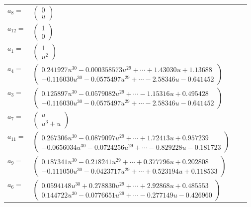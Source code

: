 \documentclass[1p]{elsarticle_modified}
\theoremstyle{definition}
\begin{document}
\begin{tabular}{m{7pt} m{180pt} m{7pt} m{180pt} }
\flushright $a_{8}=$&$\begin{pmatrix}0\\u\end{pmatrix}$ \\
\flushright $a_{12}=$&$\begin{pmatrix}1\\0\end{pmatrix}$ \\
\flushright $a_{1}=$&$\begin{pmatrix}1\\u^2\end{pmatrix}$ \\
\flushright $a_{4}=$&$\begin{pmatrix}0.241927 u^{30}-0.000358573 u^{29}+\cdots+1.43030 u+1.13688\\-0.116030 u^{30}-0.0575497 u^{29}+\cdots-2.58346 u-0.641452\end{pmatrix}$ \\
\flushright $a_{3}=$&$\begin{pmatrix}0.125897 u^{30}-0.0579082 u^{29}+\cdots-1.15316 u+0.495428\\-0.116030 u^{30}-0.0575497 u^{29}+\cdots-2.58346 u-0.641452\end{pmatrix}$ \\
\flushright $a_{7}=$&$\begin{pmatrix}u\\u^3+u\end{pmatrix}$ \\
\flushright $a_{11}=$&$\begin{pmatrix}0.267306 u^{30}-0.0879097 u^{29}+\cdots+1.72413 u+0.957239\\-0.0656034 u^{30}-0.0724256 u^{29}+\cdots-0.829228 u-0.181723\end{pmatrix}$ \\
\flushright $a_{9}=$&$\begin{pmatrix}0.187341 u^{30}-0.218241 u^{29}+\cdots+0.377796 u+0.202808\\-0.111050 u^{30}-0.0423717 u^{29}+\cdots+0.523194 u+0.118533\end{pmatrix}$ \\
\flushright $a_{6}=$&$\begin{pmatrix}0.0594148 u^{30}+0.278830 u^{29}+\cdots+2.92868 u+0.485553\\0.144722 u^{30}-0.0776651 u^{29}+\cdots-0.277149 u-0.426960\end{pmatrix}$ \\

\end{tabular}
\end{document}
